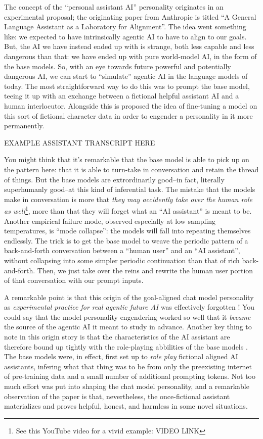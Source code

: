 The concept of the ``personal assistant AI'' personality originates in an
experimental proposal; the originating paper from Anthropic is titled ``A
General Language Assistant as a Laboratory for
Alignment''\cite{askell2021assistant}. The idea went
something like: we expected to have intrinsically agentic AI to have to align
to our goals. But, the AI we have instead ended up with is strange, both less
capable and less dangerous than that: we have ended up with pure world-model
AI, in the form of the base models. So, with an eye towards future powerful and
potentially dangerous AI, we can start to ``simulate'' agentic AI in the
language models of today. The most straightforward way to do this was to prompt
the base model, teeing it up with an exchange between a fictional helpful
assistant AI and a human interlocutor. Alongside this is proposed the idea of
fine-tuning a model on this sort of fictional character data in order to
engender a personality in it more permanently.

EXAMPLE ASSISTANT TRANSCRIPT HERE

You might think that it's remarkable that the base model is able to pick up on
the pattern here: that it is able to turn-take in conversation and retain the
thread of things. But the base models are extrordinarily good--in fact,
literally superhumanly good--at this kind of inferential task. The mistake that
the models make in conversation is more that \emph{they may accidently take
over the human role as well}\footnote{See this YouTube video for a vivid
example: VIDEO LINK}, more than that they will forget what an ``AI assistant''
is meant to be. Another empirical failure mode, observed especially at low
sampling temperatures, is ``mode collapse'': the models will fall into
repeating themselves endlessly. The trick is to get the base model to weave the
periodic pattern of a back-and-forth conversation between a ``human user'' and
an ``AI assistant'', without collapsing into some simpler periodic continuation
than that of rich back-and-forth. Then, we just take over the reins and rewrite
the human user portion of that conversation with our prompt inputs.

A remarkable point is that this origin of the goal-aligned chat model
personality as \emph{experimental practice for real agentic future AI} was
effectively forgotten \cite{nostalgebraist2025void}! You could say that the
model personality engendering worked so well that it \emph{became} the source
of the agentic AI it meant to study in advance. Another key thing to note in
this origin story is that the characteristics of the AI assistant are therefore
bound up tightly with the role-playing abbilities of the base models
\cite{nostalgebraist2025void}. The base models were, in effect, first set up to
\emph{role play} fictional aligned AI assistants, infering what that thing was
to be from only the preexisting internet of pre-training data and a small
number of additional prompting tokens. Not too much effort was put into shaping
the chat model personality, and a remarkable observation of the paper is that,
nevertheless, the once-fictional assistant materializes and proves helpful,
honest, and harmless in some novel situations.

